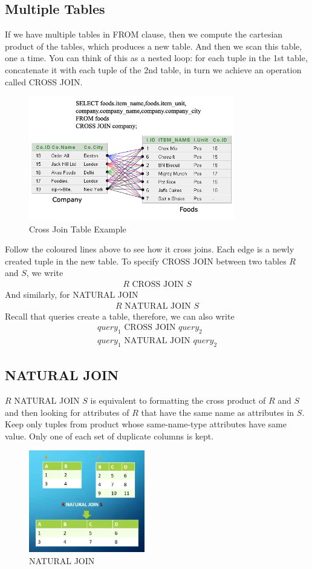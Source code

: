 \documentclass[a4paper]{article}
\theoremstyle{plain}
\theoremstyle{definition}
\theoremstyle{remark}
\begin{document}
\subsection{Multiple Tables}
If we have multiple tables in FROM clause, then we compute the cartesian product of the tables, which produces a new table. And then we scan this table, one a time. You can think of this as a nested loop: for each tuple in the 1st table, concatenate it with each tuple of the 2nd table, in turn we achieve an operation called CROSS JOIN.
\begin{figure}[H]
	\centering
	\includegraphics[width=0.8\textwidth]{cross.png}
	\caption{Cross Join Table Example}
	\label{fig:cross-png}
\end{figure}
Follow the coloured lines above to see how it cross joins. Each edge is a newly created tuple in the new table. To specify CROSS JOIN between two tables $R$ and $S$, we write
\begin{align*}
	R \text{ CROSS JOIN } S
\end{align*}
And similarly, for NATURAL JOIN
\begin{align*}
	R \text{ NATURAL JOIN }S
\end{align*}
Recall that queries create a table, therefore, we can also write
\begin{align*}
	query_1 \text{ CROSS JOIN } query_2 \\
	query_1 \text{ NATURAL JOIN } query_2
\end{align*}
\subsection{NATURAL JOIN}
$R$ NATURAL JOIN $S$ is equivalent to formatting the cross product of $R$ and $S$ and then looking for attributes of $ R$ that have the same name as attributes in $S$. Keep only tuples from product whose same-name-type attributes have same value. Only one of each set of duplicate columns is kept.
\begin{figure}[H]
	\centering
	\includegraphics[width=0.45\textwidth]{njoin.png}
	\caption{NATURAL JOIN}
	\label{fig:njoin}
\end{figure}
\end{document}

